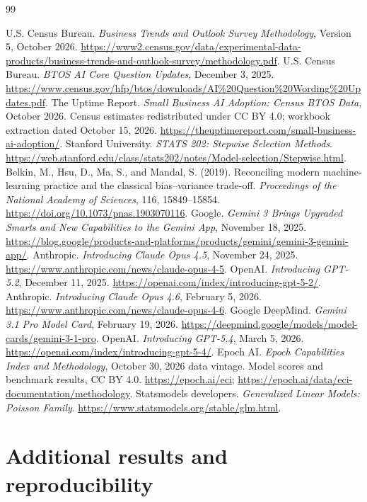 \documentclass[11pt]{article}
\begin{document}
\begin{thebibliography}{99}
\footnotesize\raggedright
\setlength{\itemsep}{0pt}
 U.S. Census Bureau. \emph{Business Trends and Outlook Survey Methodology}, Version 5, October 2026. \url{https://www2.census.gov/data/experimental-data-products/business-trends-and-outlook-survey/methodology.pdf}.
 U.S. Census Bureau. \emph{BTOS AI Core Question Updates}, December 3, 2025. \url{https://www.census.gov/hfp/btos/downloads/AI%20Question%20Wording%20Updates.pdf}.
 The Uptime Report. \emph{Small Business AI Adoption: Census BTOS Data}, October 2026. Census estimates redistributed under CC BY 4.0; workbook extraction dated October 15, 2026. \url{https://theuptimereport.com/small-business-ai-adoption/}.
 Stanford University. \emph{STATS 202: Stepwise Selection Methods}. \url{https://web.stanford.edu/class/stats202/notes/Model-selection/Stepwise.html}.
 Belkin, M., Hsu, D., Ma, S., and Mandal, S. (2019). Reconciling modern machine-learning practice and the classical bias--variance trade-off. \emph{Proceedings of the National Academy of Sciences}, 116, 15849--15854. \url{https://doi.org/10.1073/pnas.1903070116}.
 Google. \emph{Gemini 3 Brings Upgraded Smarts and New Capabilities to the Gemini App}, November 18, 2025. \url{https://blog.google/products-and-platforms/products/gemini/gemini-3-gemini-app/}.
 Anthropic. \emph{Introducing Claude Opus 4.5}, November 24, 2025. \url{https://www.anthropic.com/news/claude-opus-4-5}.
 OpenAI. \emph{Introducing GPT-5.2}, December 11, 2025. \url{https://openai.com/index/introducing-gpt-5-2/}.
 Anthropic. \emph{Introducing Claude Opus 4.6}, February 5, 2026. \url{https://www.anthropic.com/news/claude-opus-4-6}.
 Google DeepMind. \emph{Gemini 3.1 Pro Model Card}, February 19, 2026. \url{https://deepmind.google/models/model-cards/gemini-3-1-pro}.
 OpenAI. \emph{Introducing GPT-5.4}, March 5, 2026. \url{https://openai.com/index/introducing-gpt-5-4/}.
 Epoch AI. \emph{Epoch Capabilities Index and Methodology}, October 30, 2026 data vintage. Model scores and benchmark results, CC BY 4.0. \url{https://epoch.ai/eci}; \url{https://epoch.ai/data/eci-documentation/methodology}.
 Statsmodels developers. \emph{Generalized Linear Models: Poisson Family}. \url{https://www.statsmodels.org/stable/glm.html}.
\end{thebibliography}
\clearpage
\appendix
\section{Additional results and reproducibility}

\end{document}
